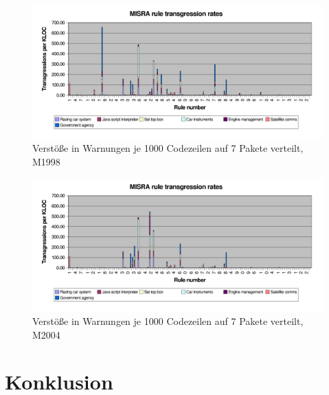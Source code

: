 \documentclass[a4paper,UKenglish,cleveref, autoref]{templates/lipics-v2019}
\begin{document}
    \begin{figure}[H]
        \centering
        \captionsetup{justification=centering,margin=2cm}
        \includegraphics[width=\textwidth]{graphics/1998-transgression-rates.png}
        \caption{Verstöße in Warnungen je 1000 Codezeilen auf 7 Pakete verteilt, M1998\cite{hatton2007language}}
    \end{figure}

    \begin{figure}[H]
        \centering
        \captionsetup{justification=centering,margin=2cm}
        \includegraphics[width=\textwidth]{graphics/2004-transgression-rates.png}
        \caption{Verstöße in Warnungen je 1000 Codezeilen auf 7 Pakete verteilt, M2004\cite{hatton2007language}}
    \end{figure}

    \section{Konklusion}
    \label{sec:konklusion}



    
\end{document}
